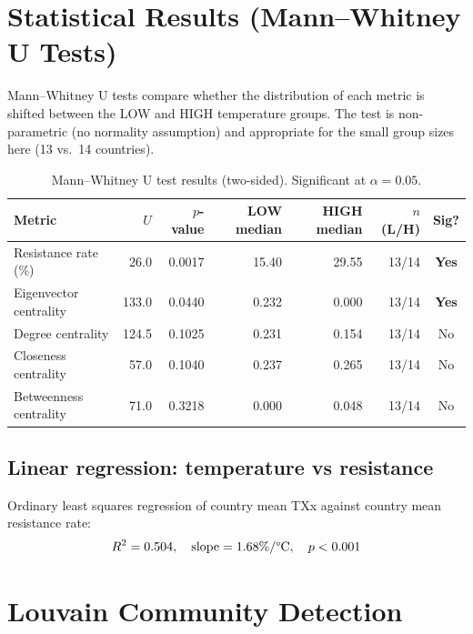 \documentclass[12pt,a4paper]{article}
\begin{document}
\section{Statistical Results (Mann--Whitney U Tests)}

Mann--Whitney U tests compare whether the distribution of each metric
is shifted between the LOW and HIGH temperature groups.
The test is non-parametric (no normality assumption) and appropriate
for the small group sizes here (13 vs.\ 14 countries).

\begin{table}[h]
\centering
\caption{Mann--Whitney U test results (two-sided). Significant at $\alpha = 0.05$.}
\label{tab:mwu}
\begin{tabular}{@{}lrrrrrc@{}}
\toprule
Metric & $U$ & $p$-value & LOW median & HIGH median & $n$ (L/H) & Sig? \\
\midrule
Resistance rate (\%) & 26.0  & 0.0017 & 15.40 & 29.55 & 13/14 & \textbf{Yes} \\
Eigenvector centrality & 133.0 & 0.0440 &  0.232 &  0.000 & 13/14 & \textbf{Yes} \\
Degree centrality   & 124.5 & 0.1025 &  0.231 &  0.154 & 13/14 & No \\
Closeness centrality & 57.0 & 0.1040 &  0.237 &  0.265 & 13/14 & No \\
Betweenness centrality & 71.0 & 0.3218 &  0.000 &  0.048 & 13/14 & No \\
\bottomrule
\end{tabular}
\end{table}

\subsection*{Linear regression: temperature vs resistance}

Ordinary least squares regression of country mean TXx
against country mean resistance rate:
\[
  R^2 = 0.504, \quad \text{slope} = 1.68\%/\text{\textdegree{}C},
  \quad p < 0.001
\]

\section{Louvain Community Detection}
\end{document}
